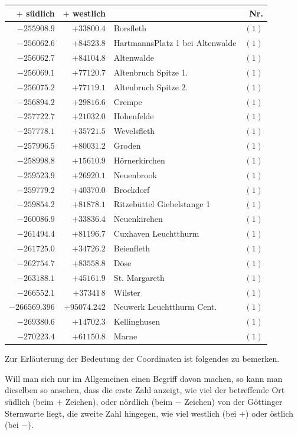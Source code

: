 \begin{center}\begingroup\fontsize{8}{9}\selectfont
\setlength{\tabcolsep}{4pt}
\begin{tabular}{r|r|p{170pt}|r}\hline
\(+\) südlich&\(+\) westlich&&Nr.\\\hline
\(-255908.9\)&\(+33800.4\)&Borsfleth&\((1)\)\\
\(-256062.6\)&\(+84523.8\)&HartmannsPlatz 1 bei Altenwalde&\((1)\)\\
\(-256062.7\)&\(+84104.8\)&Altenwalde&\((1)\)\\
\(-256069.1\)&\(+77120.7\)&Altenbruch Spitze 1.&\((1)\)\\
\(-256075.2\)&\(+77119.1\)&Altenbruch Spitze 2.&\((1)\)\\
\(-256894.2\)&\(+29816.6\)&Crempe&\((1)\)\\
\(-257722.7\)&\(+21032.0\)&Hohenfelde&\((1)\)\\
\(-257778.1\)&\(+35721.5\)&Wevelsfleth&\((1)\)\\
\(-257996.5\)&\(+80031.2\)&Groden&\((1)\)\\
\(-258998.8\)&\(+15610.9\)&Hörnerkirchen&\((1)\)\\
\(-259523.9\)&\(+26920.1\)&Neuenbrook&\((1)\)\\
\(-259779.2\)&\(+40370.0\)&Brockdorf&\((1)\)\\
\(-259854.2\)&\(+81878.1\)&Ritzebüttel Giebelstange 1&\((1)\)\\
\(-260086.9\)&\(+33836.4\)&Neuenkirchen&\((1)\)\\
\(-261494.4\)&\(+81196.7\)&Cuxhaven Leuchtthurm&\((1)\)\\
\(-261725.0\)&\(+34726.2\)&Beienfleth&\((1)\)\\
\(-262754.7\)&\(+83558.8\)&Döse&\((1)\)\\
\(-263188.1\)&\(+45161.9\)&St. Margareth&\((1)\)\\
\(-266552.1\)&\(+37341\,8\)&Wilster&\((1)\)\\
\(-266569.396\)&\(+95074.242\)&Neuwerk Leuchtthurm Cent.&\((1)\)\\
\(-269380.6\)&\(+14702.3\)&Kellinghusen&\((1)\)\\
\(-270223.4\)&\(+61150.8\)&Marne&\((1)\)\\
\hline\end{tabular}\endgroup\end{center}

Zur Erläuterung der Bedeutung der Coordinaten ist folgendes zu bemerken.

Will man sich nur im Allgemeinen einen Begriff davon machen, so kann man dieselben so ansehen, dass die erste Zahl anzeigt, wie viel der betreffende Ort südlich (beim \(+\) Zeichen), oder nördlich (beim \(-\) Zeichen) von der Göttinger Sternwarte liegt, die zweite Zahl hingegen, wie viel westlich (bei \(+\)) oder östlich (bei \(-\)).

